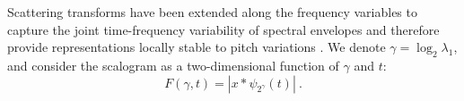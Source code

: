
%
%
%
%
Scattering transforms have been extended along the frequency
variables to capture the joint time-frequency 
variability of spectral envelopes and therefore provide 
 representations locally stable to pitch variations \cite{deepscatt}. 
We denote $\gamma = \log_2 \lambda_1$, and consider
the scalogram as a two-dimensional function of $\gamma$ and $t$: 
\[
F (\gamma, t) = |x \ast \psi_{2^{\gamma}} (t)|~.
\]

